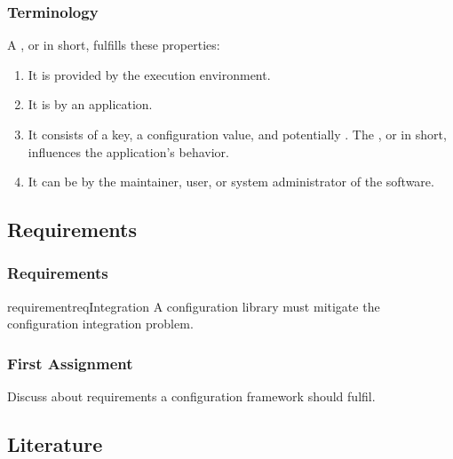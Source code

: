 \documentclass{beamer}
\begin{document}
\begin{frame}
	\frametitle{Terminology}
\begin{definition}
\label{def:configuration-setting}
A ,
or  in short,
fulfills these properties:
\begin{enumerate}
\item
It is provided by the execution environment.
\item
It is  by an application.
\item
It consists of a key, a configuration value, and potentially .
The , or  in short, influences the application's behavior.
\item
It can be  by the maintainer, user, or system administrator of the software.
\end{enumerate}
\end{definition}
\end{frame}

\subsection{Requirements}

\begin{frame}
	\frametitle{Requirements}
\begin{restatable}{requirement}{reqIntegration}
A configuration library must mitigate the configuration integration problem.%
\label{req:integration}
\end{restatable}
\end{frame}



\begin{assignment}
	\frametitle{First Assignment}
	Discuss about requirements a configuration framework should fulfil.
\end{assignment}


\subsection{Literature}

\nocite{raab2017introducing}

\begin{frame}[allowframebreaks]
	
	
\end{frame}
\end{document}
